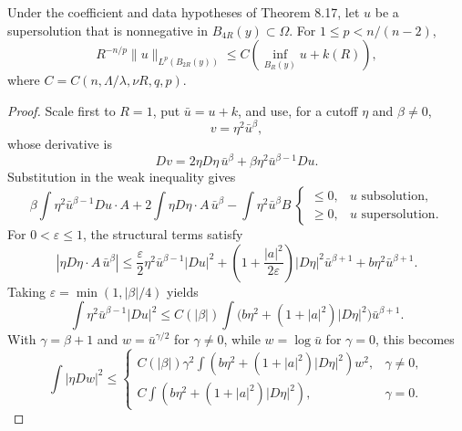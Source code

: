 \begin{theorem}
\label{gt-thm-8-18-weak-harnack}
Under the coefficient and data hypotheses of Theorem 8.17, let $u$ be a
supersolution that is nonnegative in $B_{4R}(y)\subset\Omega$. For
$1\leq p<n/(n-2)$,
\begin{equation}
R^{-n/p}\|u\|_{L^p(B_{2R}(y))}
\leq C\left(\inf_{B_R(y)}u+k(R)\right),
\tag{8.47}
\end{equation}
where $C=C(n,\Lambda/\lambda,\nu R,q,p)$.
\end{theorem}
\begin{proof}
\sketch Scale first to $R=1$, put $\bar u=u+k$, and use, for a cutoff
$\eta$ and $\beta\ne0$,
\begin{equation}
\tag{8.48}
v=\eta^2\bar u^\beta,
\end{equation}
whose derivative is
\begin{equation}
\tag{8.49}
Dv=2\eta D\eta\,\bar u^\beta
+\beta\eta^2\bar u^{\beta-1}Du.
\end{equation}
Substitution in the weak inequality gives
\begin{equation}
\tag{8.50}
\beta\int\eta^2\bar u^{\beta-1}Du\cdot A
+2\int\eta D\eta\cdot A\,\bar u^\beta
-\int\eta^2\bar u^\beta B\ \begin{cases}\leq0,&u\text{ subsolution},\\
\geq0,&u\text{ supersolution}.
\end{cases}
\end{equation}
For $0<\varepsilon\leq1$, the structural terms satisfy
\begin{equation}
\tag{8.51}
|\eta D\eta\cdot A\,\bar u^\beta|
\leq\frac\varepsilon2\eta^2\bar u^{\beta-1}|Du|^2
+\left(1+\frac{|a|^2}{2\varepsilon}\right)|D\eta|^2\bar u^{\beta+1}
+b\eta^2\bar u^{\beta+1}.
\end{equation}
Taking $\varepsilon=\min(1,|\beta|/4)$ yields
\begin{equation}
\tag{8.52}
\int\eta^2\bar u^{\beta-1}|Du|^2
\leq C(|\beta|)\int
\bigl(b\eta^2+(1+|a|^2)|D\eta|^2\bigr)\bar u^{\beta+1}.
\end{equation}
With $\gamma=\beta+1$ and
$w=\bar u^{\gamma/2}$ for $\gamma\ne0$, while $w=\log\bar u$ for
$\gamma=0$, this becomes
\begin{equation}
\tag{8.53}
\int|\eta Dw|^2\leq
\begin{cases}
C(|\beta|)\gamma^2\int
(b\eta^2+(1+|a|^2)|D\eta|^2)w^2,&\gamma\ne0,\\
C\int(b\eta^2+(1+|a|^2)|D\eta|^2),&\gamma=0.

\end{cases}
\end{equation}
\end{proof}
